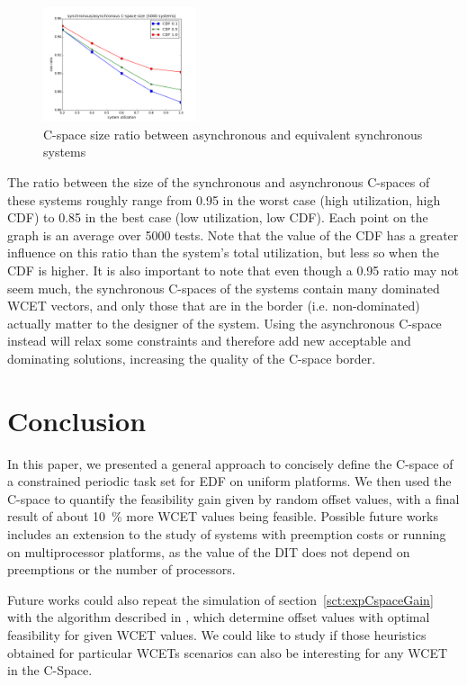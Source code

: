\documentclass[conference]{IEEEtran}
\begin{document}
	\begin{figure}[h]
		\begin{center}
			\includegraphics[width=0.4\textwidth]{figs/sizeratio.png}
			\caption{C-space size ratio between asynchronous and equivalent synchronous
			systems}
			\label{fig:sizeRatio}
		\end{center}
	\end{figure}

	The ratio between the size of the synchronous and asynchronous C-spaces of
	these systems roughly range from 0.95 in the worst case (high utilization, high
	CDF) to 0.85 in the best case (low utilization, low CDF). Each point on the graph is an average over 5000 tests.
	Note that the value of the CDF has a greater influence on this ratio than
	the system's total utilization, but less so when the CDF is higher. It is also
	important to note that even though a 0.95 ratio may not seem much, the
	synchronous C-spaces of the systems contain many dominated WCET vectors, and
	only those that are in the border (i.e. non-dominated) actually matter to the
	designer of the system. Using the asynchronous C-space instead will relax some
	constraints and therefore add new acceptable and dominating solutions,
	increasing the quality of the C-space border.

\section{Conclusion}

In this paper, we presented a general approach to concisely define the C-space of a constrained periodic task set for EDF on uniform platforms. We then used the C-space to quantify the feasibility gain given by random offset values, with a final result of about 10~\% more WCET values being feasible. Possible future works includes an extension to the study of systems with preemption costs or running on multiprocessor platforms, as the value of the DIT does not depend on preemptions or the number of processors.

Future works could also repeat the simulation of section~\ref{sct:expCspaceGain} with the algorithm described in \cite{grenier2008pushing}, which determine offset values with optimal feasibility for given WCET values. We could like to study if those heuristics obtained for particular WCETs scenarios can also be interesting for any WCET in the \mbox{C-Space}.
\end{document}
